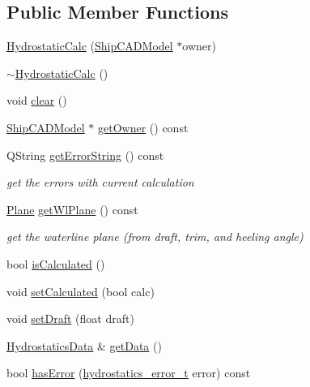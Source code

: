 \subsection*{Public Member Functions}
\begin{DoxyCompactItemize}
\item 
\hyperlink{classShipCAD_1_1HydrostaticCalc_a56877acf4c33b3cab96ce381217c7a3b}{Hydrostatic\-Calc} (\hyperlink{classShipCAD_1_1ShipCADModel}{Ship\-C\-A\-D\-Model} $\ast$owner)
\item 
\hyperlink{classShipCAD_1_1HydrostaticCalc_a382835ae6396b82371b605d662fd1696}{$\sim$\-Hydrostatic\-Calc} ()
\item 
void \hyperlink{classShipCAD_1_1HydrostaticCalc_a09403d93ebe095a41b6a29ba9b740b65}{clear} ()
\item 
\hyperlink{classShipCAD_1_1ShipCADModel}{Ship\-C\-A\-D\-Model} $\ast$ \hyperlink{classShipCAD_1_1HydrostaticCalc_ac1dc0e446e711461bb3747326efd8df6}{get\-Owner} () const 
\item 
Q\-String \hyperlink{classShipCAD_1_1HydrostaticCalc_abfc3e3da906e630cf6b763bd3559c630}{get\-Error\-String} () const 
\begin{DoxyCompactList}\small\item\em get the errors with current calculation \end{DoxyCompactList}\item 
\hyperlink{classShipCAD_1_1Plane}{Plane} \hyperlink{classShipCAD_1_1HydrostaticCalc_a157563b0f0258d21a9be615e092d5b21}{get\-Wl\-Plane} () const 
\begin{DoxyCompactList}\small\item\em get the waterline plane (from draft, trim, and heeling angle) \end{DoxyCompactList}\item 
bool \hyperlink{classShipCAD_1_1HydrostaticCalc_a875b9708e91db4a8f06ddbcc8a22d830}{is\-Calculated} ()
\item 
void \hyperlink{classShipCAD_1_1HydrostaticCalc_a0deeafff07f3bb77184df959bbd91266}{set\-Calculated} (bool calc)
\item 
void \hyperlink{classShipCAD_1_1HydrostaticCalc_a6528fe532bbb1121c73972906d108835}{set\-Draft} (float draft)
\item 
\hyperlink{structShipCAD_1_1HydrostaticsData}{Hydrostatics\-Data} \& \hyperlink{classShipCAD_1_1HydrostaticCalc_aabcae04d59358b87b9d5fb4ffda83f1a}{get\-Data} ()
\item 
bool \hyperlink{classShipCAD_1_1HydrostaticCalc_a8ae6f41fd9799cb17a855a9b4f89c5fb}{has\-Error} (\hyperlink{namespaceShipCAD_a1d801b982c24bce0cf10ffd4b995dda0}{hydrostatics\-\_\-error\-\_\-t} error) const 

\end{DoxyCompactItemize}
